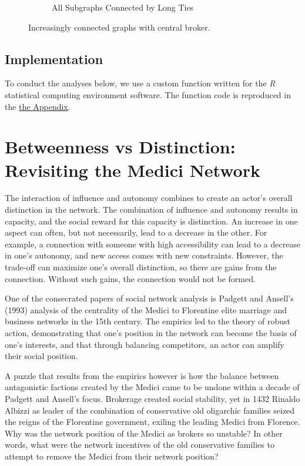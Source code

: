 \documentclass[12pt]{article}
\begin{document}
\begin{figure}
\begin{subfigure}[b]{0.45\textwidth}
            \caption{All Subgraphs Connected by Long Ties}
            \label{fig:Placehold}
    \end{subfigure}
    \caption{Increasingly connected graphs with central broker.}
    \label{fig:Evolving Political Network}
\end{figure}




\subsection{Implementation}
To conduct the analyses below, we use a custom function written for the \textit{R} statistical computing environment \citep{R} software. The function code is reproduced in the \hyperref[sec:appendix]{the Appendix}.

\section{Betweenness vs Distinction: Revisiting the Medici Network}
The interaction of influence and autonomy combines to create an actor’s overall distinction in the network. The combination of influence and autonomy results in capacity, and the social reward for this capacity is distinction. An increase in one aspect can often, but not necessarily, lead to a decrease in the other. For example, a connection with someone with high accessibility can lead to a decrease in one’s autonomy, and new access comes with new constraints. However, the trade-off can maximize one’s overall distinction, so there are gains from the connection. Without such gains, the connection would not be formed.

One of the consecrated papers of social network analysis is Padgett and Ansell’s (1993) analysis of the centrality of the Medici to Florentine elite marriage and business networks in the 15th century. The empirics led to the theory of robust action, demonstrating that one’s position in the network can become the basis of one’s interests, and that through balancing competitors, an actor can amplify their social position. 

A puzzle that results from the empirics however is how the balance between antagonistic factions created by the Medici came to be undone within a decade of Padgett and Ansell’s focus. Brokerage created social stability, yet in 1432 Rinaldo Albizzi as leader of the combination of conservative old oligarchic families seized the reigns of the Florentine government, exiling the leading Medici from Florence. Why was the network position of the Medici as brokers so unstable? In other words, what were the network incentives of the old conservative families to attempt to remove the Medici from their network position? 
\end{document}
